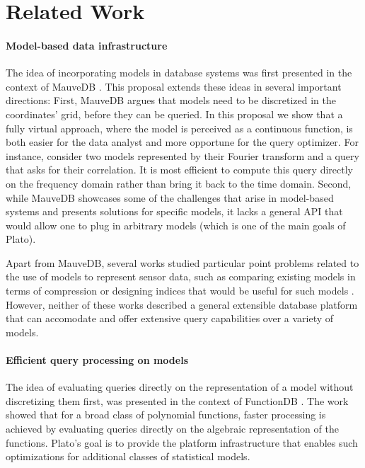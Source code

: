 \section{Related Work}


\paragraph{Model-based data infrastructure}
The idea of incorporating models in database systems was first presented in the context of MauveDB \cite{mauvedb-grid, mauvedb-cidr, mauvedb-vldb}. This proposal extends these ideas in several important directions: First, MauveDB argues that models need to be discretized in the coordinates' grid, before they can be queried. In this proposal we show that a fully virtual approach, where the model is perceived as a continuous function, is both easier for the data analyst and more opportune for the query optimizer. For instance, consider two models represented by their Fourier transform and a query that asks for their correlation. It is most efficient to compute this query directly on the frequency domain rather than bring it back to the time domain. Second, while MauveDB showcases some of the challenges that arise in model-based systems and presents solutions for specific models, it lacks a general API that would allow one to plug in arbitrary models (which is one of the main goals of Plato). 

Apart from MauveDB, several works studied particular point problems related to the use of models to represent sensor data, such as comparing existing models in terms of compression or designing indices that would be useful for such models \cite{aberer-cloud, aberer-compression}. However, neither of these works described a general extensible database platform that can accomodate and offer extensive query capabilities over a variety of models.

\paragraph{Efficient query processing on models} The idea of evaluating queries directly on the representation of a model without discretizing them first, was presented in the context of FunctionDB \cite{functiondb}. The work showed that for a broad class of polynomial functions, faster processing is achieved by evaluating queries directly on the algebraic representation of the functions. Plato's goal is to provide the platform infrastructure that enables such optimizations for additional classes of statistical models.

